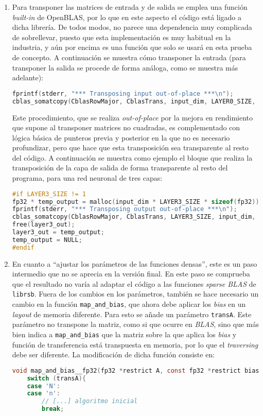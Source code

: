 \begin{enumerate}
    \item Para transponer las matrices de entrada y de salida se emplea una función \textit{built-in} de OpenBLAS, por lo que en este aspecto el código está ligado a dicha librería. De todos modos, no parece una dependencia muy complicada de sobrellevar, puesto que esta implementación es muy habitual en la industria, y aún por encima es una función que solo se usará en esta prueba de concepto. A continuación se muestra cómo transponer la entrada (para transponer la salida se procede de forma análoga, como se muestra más adelante):\medskip
\begin{lstlisting}[language=C]
fprintf(stderr, "*** Transposing input out-of-place ***\n");
cblas_somatcopy(CblasRowMajor, CblasTrans, input_dim, LAYER0_SIZE, 1.f, (float *) input, LAYER0_SIZE, (float *) temp_input, input_dim);
\end{lstlisting}

    Este procedimiento, que se realiza \textit{out-of-place} por la mejora en rendimiento que supone al transponer matrices no cuadradas, es complementado con lógica básica de punteros previa y posterior en la que no es necesario profundizar, pero que hace que esta transposición sea transparente al resto del código. A continuación se muestra como ejemplo el bloque que realiza la transposición de la capa de salida de forma transparente al resto del programa, para una red neuronal de tres capas:\medskip
\begin{lstlisting}[language=C]
#if LAYER3_SIZE != 1
fp32 * temp_output = malloc(input_dim * LAYER3_SIZE * sizeof(fp32));
fprintf(stderr, "*** Transposing output out-of-place ***\n");
cblas_somatcopy(CblasRowMajor, CblasTrans, LAYER3_SIZE, input_dim, 1.f, (float *) layer3_out, input_dim, (float *) temp_output, LAYER3_SIZE);
free(layer3_out);
layer3_out = temp_output;
temp_output = NULL;
#endif
\end{lstlisting}

    \item En cuanto a ``ajustar los parámetros de las funciones densas'', este es un paso intermedio que no se aprecia en la versión final. En este paso se comprueba que el resultado no varía al adaptar el código a las funciones \textit{sparse BLAS} de \texttt{librsb}. Fuera de los cambios en los parámetros, también se hace necesario un cambio en la función \texttt{map\_and\_bias}, que ahora debe aplicar los \textit{bias} en un \textit{layout} de memoria diferente. Para esto se añade un parámetro \texttt{transA}. Este parámetro no transpone la matriz, como si que ocurre en \textit{BLAS}, sino que más bien indica a \texttt{map\_and\_bias} que la matriz sobre la que aplica los \textit{bias} y función de transferencia está transpuesta en memoria, por lo que el \textit{traversing} debe ser diferente. La modificación de dicha función consiste en:\medskip
\begin{lstlisting}[language=C]
void map_and_bias__fp32(fp32 *restrict A, const fp32 *restrict bias, const uint32_t M, const uint32_t N, const char transA, fp32 (* map_function)(fp32 x)){
    switch (transA){
    case 'N':
    case 'n':
        // [...] algoritmo inicial
        break;


\end{lstlisting}
\end{enumerate}
